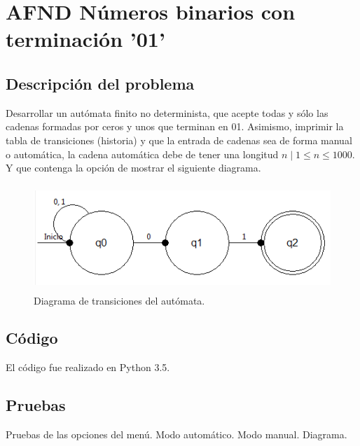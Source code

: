 \section{AFND Números binarios con terminación '01'}
	\subsection{Descripción del problema}
	Desarrollar un autómata finito no determinista, que acepte todas y sólo las cadenas formadas por ceros y unos que terminan en 01. Asimismo, imprimir la tabla de transiciones (historia) y que la entrada de cadenas sea de forma manual o automática, la cadena automática debe de tener una longitud $n \mid 1  \leq n \leq 1000$. Y que contenga la opción de mostrar el siguiente diagrama.
	\begin{figure}[ht]
		\begin{center}
			\includegraphics[width=12cm, height=4cm]{img/cero-uno.png}
			\caption{Diagrama de transiciones del autómata. \cite{LIBRO}}
			\label{fig:diagrama4}
		\end{center}
	\end{figure}
	
	\subsection{Código}
	El código fue realizado en Python 3.5.
	\subsection{Pruebas}
	Pruebas de las opciones del menú.
	{\large Modo automático.}
	{\large Modo manual.}
	{\large Diagrama.}